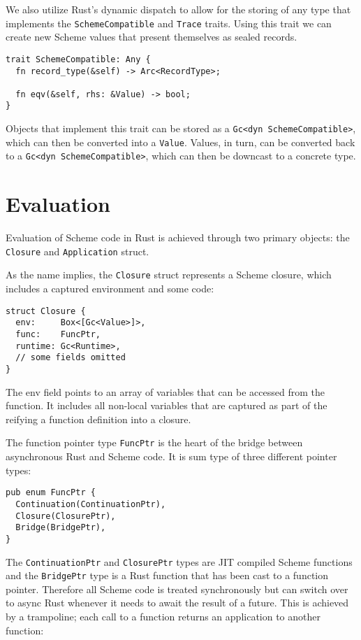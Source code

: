 \documentclass[sigplan,authordraft]{acmart}
\begin{document}
We also utilize Rust's dynamic dispatch to allow for the storing of any type that
implements the \texttt{SchemeCompatible} and \texttt{Trace} traits. Using this
trait we can create new Scheme values that present themselves as sealed records.

\begin{verbatim}
trait SchemeCompatible: Any {
  fn record_type(&self) -> Arc<RecordType>;

  fn eqv(&self, rhs: &Value) -> bool;
}
\end{verbatim}

Objects that implement this trait can be stored as a \texttt{Gc<dyn SchemeCompatible>},
which can then be converted into a \texttt{Value}. Values, in turn, can be converted
back to a \texttt{Gc<dyn SchemeCompatible>}, which can then be downcast to a concrete
type.

\section{Evaluation}

Evaluation of Scheme code in Rust is achieved through two primary objects: the
\texttt{Closure} and \texttt{Application} struct.

As the name implies, the \texttt{Closure} struct represents a Scheme closure,
which includes a captured environment and some code:

\begin{verbatim}
struct Closure {
  env:     Box<[Gc<Value>]>,
  func:    FuncPtr,
  runtime: Gc<Runtime>,
  // some fields omitted
}
\end{verbatim}

The env field points to an array of variables that can be accessed from the
function. It includes all non-local variables that are captured as part of the
reifying a function definition into a closure.

The function pointer type \texttt{FuncPtr} is the heart of the bridge between
asynchronous Rust and Scheme code. It is sum type of three different pointer
types:

\begin{verbatim}
pub enum FuncPtr {
  Continuation(ContinuationPtr),
  Closure(ClosurePtr),
  Bridge(BridgePtr),
}
\end{verbatim}

The \texttt{ContinuationPtr} and \texttt{ClosurePtr} types are JIT compiled
Scheme functions and the \texttt{BridgePtr} type is a Rust function that has
been cast to a function pointer. Therefore all Scheme code is treated
synchronously but can switch over to async Rust whenever it needs to await the
result of a future. This is achieved by a trampoline; each call to a function
returns an application to another function:
\end{document}
